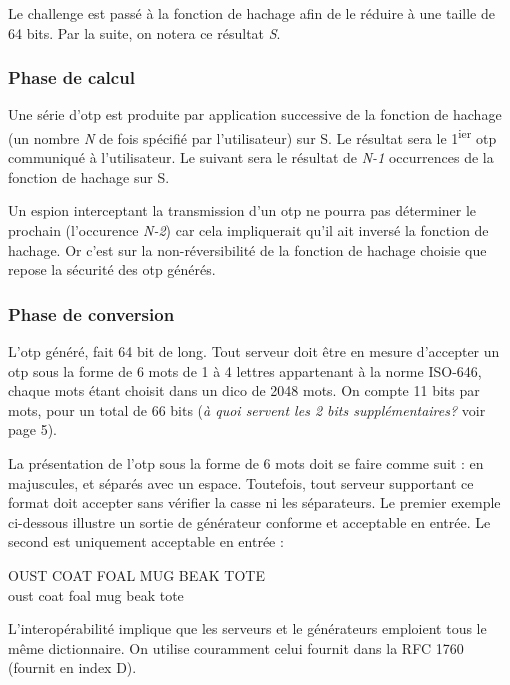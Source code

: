 \documentclass{../res/univ-projet}
\begin{document}
      Le challenge est passé à la fonction de hachage afin de le réduire à une 
taille de 64 bits. Par la suite, on notera ce résultat \emph{S}.

    \subsubsection{Phase de calcul}
      Une série d'otp est produite par application successive de la fonction de 
hachage (un nombre \emph{N} de fois spécifié par l'utilisateur) sur S. Le 
résultat sera le 1\textsuperscript{ier} otp communiqué à l'utilisateur. Le 
suivant sera le résultat de \emph{N-1} occurrences de la fonction de hachage sur 
S. 

      Un espion interceptant la transmission d'un otp ne pourra pas déterminer 
le prochain (l'occurence \emph{N-2}) car cela impliquerait qu'il ait inversé la 
fonction de hachage. Or c'est sur la non-réversibilité de la fonction de hachage 
choisie que repose la sécurité des otp générés.\\



    \subsubsection{Phase de conversion}
        L'otp généré, fait 64 bit de long. Tout serveur doit être en mesure 
d'accepter un otp sous la forme de 6 mots de 1 à 4 lettres appartenant à la 
norme ISO-646, chaque mots étant choisit dans un dico de 2048 mots. On compte 11 
bits par mots, pour un total de 66 bits (\emph{à quoi servent les 2 bits 
supplémentaires?} voir page 5).

        La présentation de l'otp sous la forme de 6 mots doit se faire comme 
suit : en majuscules, et séparés avec un espace. Toutefois, tout serveur 
supportant ce format doit accepter sans vérifier la casse ni les séparateurs. Le 
premier exemple ci-dessous illustre un sortie de générateur conforme et 
acceptable en entrée. Le second est uniquement acceptable en entrée :
        \begin{center}
            OUST COAT FOAL MUG BEAK TOTE\\
            oust coat foal mug beak tote
        \end{center}

        L'interopérabilité implique que les serveurs et le générateurs emploient 
tous le même dictionnaire. On utilise couramment celui fournit dans la RFC 1760 
(fournit en index D).
\end{document}
